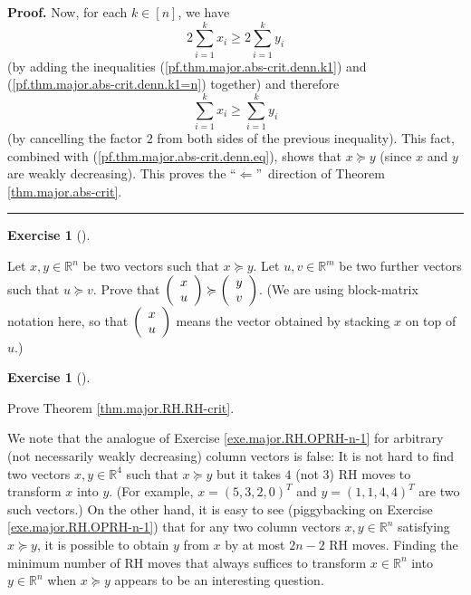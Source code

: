 \documentclass[numbers=enddot,12pt,final,onecolumn,notitlepage]{scrartcl}%
\newcounter{exer}
\numberwithin{exer}{subsection}
\theoremstyle{definition}
\newtheorem{exmp}[exer]{Exercise}
\newenvironment{exercise}[1][]
{\begin{exmp}[#1]\begin{leftbar}}
{\end{leftbar}\end{exmp}}
\newenvironment{proof}[1][Proof]{\noindent\textbf{#1.} }{\ \rule{0.5em}{0.5em}}
\let\sumnonlimits\sum
\renewcommand{\sum}{\sumnonlimits\limits}
\begin{document}
\begin{proof}
Now, for each $k\in\left[  n\right]  $, we have%
\[
2\sum_{i=1}^{k}x_{i}\geq2\sum_{i=1}^{k}y_{i}%
\]
(by adding the inequalities (\ref{pf.thm.major.abs-crit.denn.k1}) and
(\ref{pf.thm.major.abs-crit.denn.k1=n}) together) and therefore
\[
\sum_{i=1}^{k}x_{i}\geq\sum_{i=1}^{k}y_{i}%
\]
(by cancelling the factor $2$ from both sides of the previous inequality).
This fact, combined with (\ref{pf.thm.major.abs-crit.denn.eq}), shows that
$x\succcurlyeq y$ (since $x$ and $y$ are weakly decreasing). This proves the
\textquotedblleft$\Longleftarrow$\textquotedblright\ direction of Theorem
\ref{thm.major.abs-crit}.
\end{proof}

\begin{exercise}
 Let $x,y\in\mathbb{R}^{n}$ be two vectors such that $x\succcurlyeq
y$. Let $u,v\in\mathbb{R}^{m}$ be two further vectors such that $u\succcurlyeq
v$. Prove that $\left(
\begin{array}
[c]{c}%
x\\
u
\end{array}
\right)  \succcurlyeq\left(
\begin{array}
[c]{c}%
y\\
v
\end{array}
\right)  $. (We are using block-matrix notation here, so that $\left(
\begin{array}
[c]{c}%
x\\
u
\end{array}
\right)  $ means the vector obtained by stacking $x$ on top of $u$.)
\end{exercise}

\begin{exercise}
 Prove Theorem \ref{thm.major.RH.RH-crit}.
\end{exercise}

We note that the analogue of Exercise \ref{exe.major.RH.OPRH-n-1} for
arbitrary (not necessarily weakly decreasing) column vectors is false: It is
not hard to find two vectors $x,y\in\mathbb{R}^{4}$ such that $x\succcurlyeq
y$ but it takes $4$ (not $3$) RH moves to transform $x$ into $y$. (For
example, $x=\left(  5,3,2,0\right)  ^{T}$ and $y=\left(  1,1,4,4\right)  ^{T}$
are two such vectors.) On the other hand, it is easy to see (piggybacking on
Exercise \ref{exe.major.RH.OPRH-n-1}) that for any two column vectors
$x,y\in\mathbb{R}^{n}$ satisfying $x\succcurlyeq y$, it is possible to obtain
$y$ from $x$ by at most $2n-2$ RH moves. Finding the minimum number of RH
moves that always suffices to transform $x\in\mathbb{R}^{n}$ into
$y\in\mathbb{R}^{n}$ when $x\succcurlyeq y$ appears to be an interesting
question. \medskip
\end{document}
